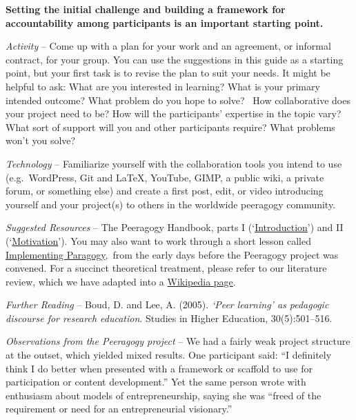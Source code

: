 \textbf{Setting the initial challenge and building a framework for
accountability among participants is an important starting point.}

\emph{Activity} -- Come up with a plan for your work and an agreement,
or informal contract, for your group. You can use the suggestions in
this guide as a starting point, but your first task is to revise the
plan to suit your needs. It might be helpful to ask: What are you
interested in learning? What is your primary intended outcome? What
problem do you hope to solve? ~How collaborative does your project need
to be? How will the participants' expertise in the topic vary? What sort
of support will you and other participants require? What problems won't
you solve?

\emph{Technology} -- Familiarize yourself with the collaboration tools
you intend to use (e.g.~WordPress, Git and LaTeX, YouTube, GIMP, a
public wiki, a private forum, or something else) and create a first
post, edit, or video introducing yourself and your project(s) to others
in the worldwide peeragogy community.

\emph{Suggested Resources} -- The Peeragogy Handbook, parts I
(`\href{http://peeragogy.org/}{Introduction}') and II
(`\href{http://peeragogy.org/motivation/}{Motivation}'). You may
also want to work through a short lesson called
\href{https://en.wikiversity.org/wiki/User:Arided/ImplementingParagogy}{Implementing
Paragogy},~from the early days before the Peeragogy project was
convened. For a succinct theoretical treatment, please refer to our
literature review, which we have adapted into a
\href{http://en.wikipedia.org/wiki/Peer_learning}{Wikipedia page}.

\emph{Further Reading} -- Boud, D. and Lee, A. (2005). \emph{`Peer
learning' as pedagogic discourse for research education}. Studies in
Higher Education, 30(5):501--516.

\emph{Observations from the Peeragogy project} -- We had a fairly weak
project structure at the outset, which yielded mixed results. One
participant said: ``I definitely think I do better when presented with a
framework or scaffold to use for participation or content development.''
Yet the same person wrote with enthusiasm about models of
entrepreneurship, saying she was ``freed of the requirement or need for
an entrepreneurial visionary.'' 

\noindent{}

